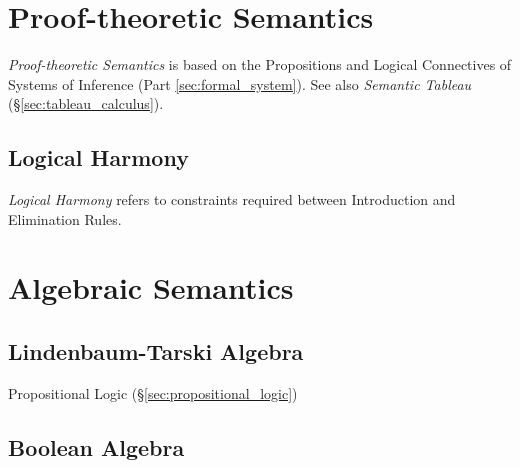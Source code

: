 \section{Proof-theoretic Semantics}\label{sec:proof_semantics}

\emph{Proof-theoretic Semantics} is based on the Propositions and
Logical Connectives of Systems of Inference (Part
\ref{sec:formal_system}). See also \emph{Semantic Tableau}
(\S\ref{sec:tableau_calculus}).



\subsection{Logical Harmony} \label{sec:logical_harmony}

\emph{Logical Harmony} refers to constraints required between
Introduction and Elimination Rules.



\section{Algebraic Semantics}\label{sec:algebraic_semantics}

\subsection{Lindenbaum-Tarski Algebra}\label{sec:lindenbaum_tarski}

Propositional Logic (\S\ref{sec:propositional_logic})



\subsection{Boolean Algebra}\label{sec:boolean_algebra}

